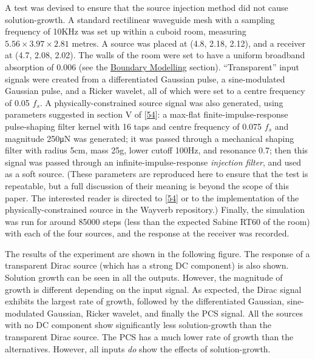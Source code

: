 \documentclass[]{scrreprt}
\begin{document}
A test was devised to ensure that the source injection method did not
cause solution-growth. A standard rectilinear waveguide mesh with a
sampling frequency of 10KHz was set up within a cuboid room, measuring
\(5.56 \times 3.97 \times 2.81\) metres. A source was placed at (4.8,
2.18, 2.12), and a receiver at (4.7, 2.08, 2.02). The walls of the room
were set to have a uniform broadband absorption of 0.006 (see the
\href{\%7B\%7B\%20site.baseurl\%7D\%7D\%7B\%\%20link\%20boundary.md\%20\%\%7D}{Boundary
Modelling} section). ``Transparent'' input signals were created from a
differentiated Gaussian pulse, a sine-modulated Gaussian pulse, and a
Ricker wavelet, all of which were set to a centre frequency of 0.05
\(f_s\). A physically-constrained source signal was also generated,
using parameters suggested in section V of
{[}\protect\hyperlink{ref-sheafferux5fphysicalux5f2014}{54}{]}: a
max-flat finite-impulse-response pulse-shaping filter kernel with 16
taps and centre frequency of 0.075 \(f_s\) and magnitude 250μN was
generated; it was passed through a mechanical shaping filter with radius
5cm, mass 25g, lower cutoff 100Hz, and resonance 0.7; then this signal
was passed through an infinite-impulse-response \emph{injection filter},
and used as a soft source. (These parameters are reproduced here to
ensure that the test is repeatable, but a full discussion of their
meaning is beyond the scope of this paper. The interested reader is
directed to
{[}\protect\hyperlink{ref-sheafferux5fphysicalux5f2014}{54}{]} or to the
implementation of the physically-constrained source in the Wayverb
repository.) Finally, the simulation was run for around 85000 steps
(less than the expected Sabine RT60 of the room) with each of the four
sources, and the response at the receiver was recorded.

The results of the experiment are shown in the following figure\text{
(\ref{fig:solution_growth_results})}. The response of a transparent
Dirac source (which has a strong DC component) is also shown. Solution
growth can be seen in all the outputs. However, the magnitude of growth
is different depending on the input signal. As expected, the Dirac
signal exhibits the largest rate of growth, followed by the
differentiated Gaussian, sine-modulated Gaussian, Ricker wavelet, and
finally the PCS signal. All the sources with no DC component show
significantly less solution-growth than the transparent Dirac source.
The PCS has a much lower rate of growth than the alternatives. However,
all inputs \emph{do} show the effects of solution-growth.
\end{document}
